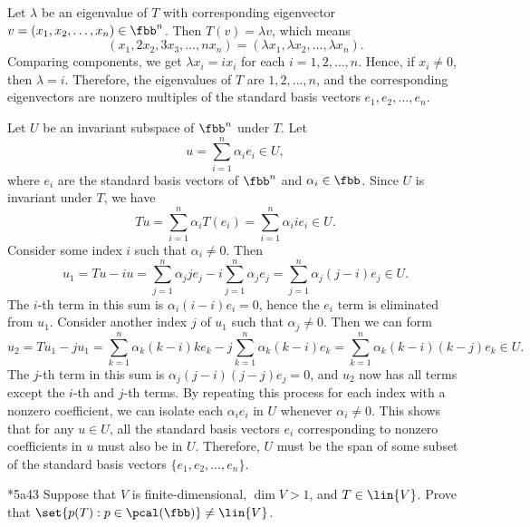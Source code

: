 \begin{solenum}
    \item Let $\lambda$ be an eigenvalue of $T$ with corresponding eigenvector $v = (x_1, x_2, \ldots, x_n) \in \fbb^n$.
	Then $T(v) = \lambda v$, which means
    \[
    	(x_1, 2x_2, 3x_3, \ldots, nx_n) = (\lambda x_1, \lambda x_2, \ldots, \lambda x_n).
    \]
    Comparing components, we get $\lambda x_i = i x_i$ for each $i = 1, 2, \ldots, n$.
	Hence, if $x_i \neq 0$, then $\lambda = i$.
	Therefore, the eigenvalues of $T$ are $1, 2, \ldots, n$, and the corresponding eigenvectors are nonzero multiples of the standard basis vectors $e_1, e_2, \ldots, e_n$.
    \item Let $U$ be an invariant subspace of $\fbb^n$ under $T$.
	Let
    \[
    	u = \sum_{i = 1}^n \alpha_i e_i \in U,
    \]
    where $e_i$ are the standard basis vectors of $\fbb^n$ and $\alpha_i \in \fbb$.
	Since $U$ is invariant under $T$, we have
    \[
    	Tu = \sum_{i = 1}^n \alpha_i T(e_i) = \sum_{i = 1}^n \alpha_i i e_i \in U.
    \]
    Consider some index $i$ such that $\alpha_i \neq 0$.
	Then
    \[
    	u_1 = Tu - i u = \sum_{j = 1}^n \alpha_j j e_j - i \sum_{j = 1}^n \alpha_j e_j = \sum_{j = 1}^n \alpha_j (j - i) e_j \in U.
    \]
    The $i$-th term in this sum is $\alpha_i (i - i) e_i = 0$, hence the $e_i$ term is eliminated from $u_1$.
	Consider another index $j$ of $u_1$ such that $\alpha_j \neq 0$.
	Then we can form
    \[
    	u_2 = Tu_1 - j u_1 = \sum_{k = 1}^n \alpha_k (k - i) k e_k - j \sum_{k = 1}^n \alpha_k (k - i) e_k = \sum_{k = 1}^n \alpha_k (k - i) (k - j) e_k \in U.
    \]
    The $j$-th term in this sum is $\alpha_j (j - i) (j - j) e_j = 0$, and $u_2$ now has all terms except the $i$-th and $j$-th terms.
	By repeating this process for each index with a nonzero coefficient, we can isolate each $\alpha_i e_i$ in $U$ whenever $\alpha_i \neq 0$.
    This shows that for any $u \in U$, all the standard basis vectors $e_i$ corresponding to nonzero coefficients in $u$ must also be in $U$.
	Therefore, $U$ must be the span of some subset of the standard basis vectors $\{e_1, e_2, \ldots, e_n\}$.
\end{solenum}

\begin{exercise}*{5a43}
    Suppose that $V$ is finite-dimensional, $\dim V > 1$, and $T \in \lin{V}$.
	Prove that $\set{p(T) : p \in \pcal(\fbb)} \neq \lin{V}$.
\end{exercise}

